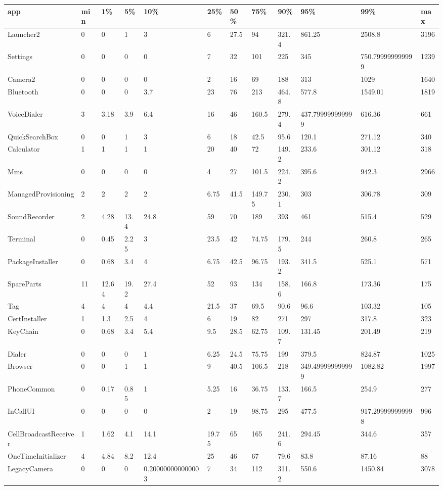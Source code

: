 \begin{tabular}{|l|l|l|l|l|l|l|l|l|l|l|l|}
\hline
app&min&1\%&5\%&10\%&25\%&50\%&75\%&90\%&95\%&99\%&max\\
\hline
Launcher2&0&0&1&3&6&27.5&94&321.4&861.25&2508.8&3196\\
\hline
Settings&0&0&0&0&7&32&101&225&345&750.799999999999&1239\\
\hline
Camera2&0&0&0&0&2&16&69&188&313&1029&1640\\
\hline
Bluetooth&0&0&0&3.7&23&76&213&464.8&577.8&1549.01&1819\\
\hline
VoiceDialer&3&3.18&3.9&6.4&16&46&160.5&279.4&437.799999999999&616.36&661\\
\hline
QuickSearchBox&0&0&1&3&6&18&42.5&95.6&120.1&271.12&340\\
\hline
Calculator&1&1&1&1&20&40&72&149.2&233.6&301.12&318\\
\hline
Mms&0&0&0&0&4&27&101.5&224.2&395.6&942.3&2966\\
\hline
ManagedProvisioning&2&2&2&2&6.75&41.5&149.75&230.1&303&306.78&309\\
\hline
SoundRecorder&2&4.28&13.4&24.8&59&70&189&393&461&515.4&529\\
\hline
Terminal&0&0.45&2.25&3&23.5&42&74.75&179.5&244&260.8&265\\
\hline
PackageInstaller&0&0.68&3.4&4&6.75&42.5&96.75&193.2&341.5&525.1&571\\
\hline
SpareParts&11&12.64&19.2&27.4&52&93&134&158.6&166.8&173.36&175\\
\hline
Tag&4&4&4&4.4&21.5&37&69.5&90.6&96.6&103.32&105\\
\hline
CertInstaller&1&1.3&2.5&4&6&19&82&271&297&317.8&323\\
\hline
KeyChain&0&0.68&3.4&5.4&9.5&28.5&62.75&109.7&131.45&201.49&219\\
\hline
Dialer&0&0&0&1&6.25&24.5&75.75&199&379.5&824.87&1025\\
\hline
Browser&0&0&1&1&9&40.5&106.5&218&349.499999999999&1082.82&1997\\
\hline
PhoneCommon&0&0.17&0.85&1&5.25&16&36.75&133.7&166.5&254.9&277\\
\hline
InCallUI&0&0&0&0&2&19&98.75&295&477.5&917.299999999998&996\\
\hline
CellBroadcastReceiver&1&1.62&4.1&14.1&19.75&65&165&241.6&294.45&344.6&357\\
\hline
OneTimeInitializer&4&4.84&8.2&12.4&25&46&67&79.6&83.8&87.16&88\\
\hline
LegacyCamera&0&0&0&0.200000000000003&7&34&112&311.2&550.6&1450.84&3078\\

\end{tabular}
